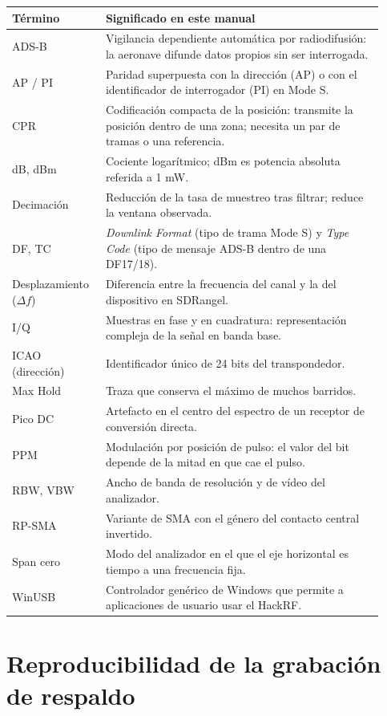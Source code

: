 \begin{longtable}{@{}>{\raggedright\arraybackslash}p{0.22\linewidth}>{\raggedright\arraybackslash}p{0.70\linewidth}@{}}
\toprule
\textbf{Término} & \textbf{Significado en este manual} \\
\midrule
\endhead
ADS-B & Vigilancia dependiente automática por radiodifusión: la aeronave difunde datos propios sin ser interrogada. \\
AP / PI & Paridad superpuesta con la dirección (AP) o con el identificador de interrogador (PI) en Mode S. \\
CPR & Codificación compacta de la posición: transmite la posición dentro de una zona; necesita un par de tramas o una referencia. \\
dB, dBm & Cociente logarítmico; dBm es potencia absoluta referida a 1 mW. \\
Decimación & Reducción de la tasa de muestreo tras filtrar; reduce la ventana observada. \\
DF, TC & \emph{Downlink Format} (tipo de trama Mode S) y \emph{Type Code} (tipo de mensaje ADS-B dentro de una DF17/18). \\
Desplazamiento ($\Delta f$) & Diferencia entre la frecuencia del canal y la del dispositivo en SDRangel. \\
I/Q & Muestras en fase y en cuadratura: representación compleja de la señal en banda base. \\
ICAO (dirección) & Identificador único de 24 bits del transpondedor. \\
Max Hold & Traza que conserva el máximo de muchos barridos. \\
Pico DC & Artefacto en el centro del espectro de un receptor de conversión directa. \\
PPM & Modulación por posición de pulso: el valor del bit depende de la mitad en que cae el pulso. \\
RBW, VBW & Ancho de banda de resolución y de vídeo del analizador. \\
RP-SMA & Variante de SMA con el género del contacto central invertido. \\
Span cero & Modo del analizador en el que el eje horizontal es tiempo a una frecuencia fija. \\
WinUSB & Controlador genérico de Windows que permite a aplicaciones de usuario usar el HackRF. \\
\bottomrule
\end{longtable}

\section{Reproducibilidad de la grabación de respaldo}
\label{sec:reproducibilidad}

